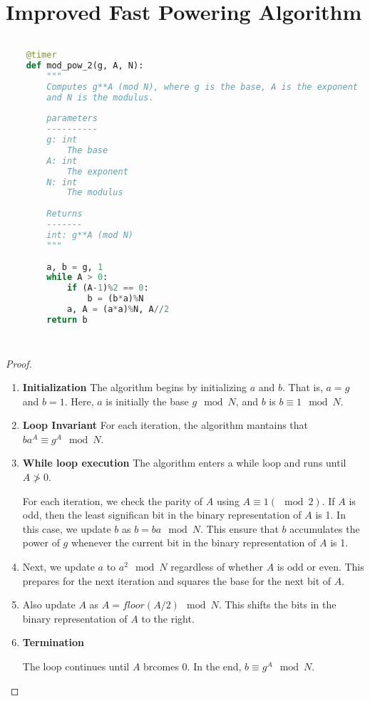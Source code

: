 \documentclass[12pt]{article}
\theoremstyle{definition}
\begin{document}
\section*{Improved Fast Powering Algorithm}

\begin{lstlisting}[language=Python, caption=Fast Powering Algorithm]
      
    @timer
    def mod_pow_2(g, A, N):
        """
        Computes g**A (mod N), where g is the base, A is the exponent
        and N is the modulus.
    
        parameters
        ----------
        g: int
            The base
        A: int 
            The exponent
        N: int
            The modulus
    
        Returns 
        -------
        int: g**A (mod N)
        """
    
        a, b = g, 1
        while A > 0:
            if (A-1)%2 == 0:
                b = (b*a)%N
            a, A = (a*a)%N, A//2
        return b
    
        
\end{lstlisting}

\begin{proof}
    \begin{enumerate}
        \item \textbf{Initialization} The algorithm begins by initializing $a$ and $b$. 
        That is, $a = g$ and $b = 1$. Here, $a$ is initially the base $g \mod N$, and $b$
        is $b \equiv 1 \mod N$.
        \item \textbf{Loop Invariant}
        For each iteration, the algorithm mantains that $ba^A \equiv g^A \mod N$.

        \item \textbf{While loop execution}
        The algorithm enters a while loop and runs until $A \not > 0$.

        For each iteration, we check the parity of $A$ using $A \equiv 1 (\mod 2)$. If $A$ is odd, 
        then the least significan bit in the binary representation of $A$ is 1. In this case,
        we update $b$ as $b = ba \mod N$. This ensure that $b$ accumulates the power of $g$ whenever
        the current bit in the binary representation of $A$ is 1.


        \item Next, we update $a$ to $a^2 \mod N$ regardless of whether $A$ is odd or even.  This prepares 
        for the next iteration and squares the base for the next bit of $A$.

        \item Also update $A$ as $A = floor(A/2) \mod N$. This shifts the bits in the binary representation of $A$
        to the right.

        \item \textbf{Termination}
        
        The loop continues until $A$ brcomes 0. In the end, $b \equiv g^A \mod N$.
     \end{enumerate}
\end{proof}
\end{document}
